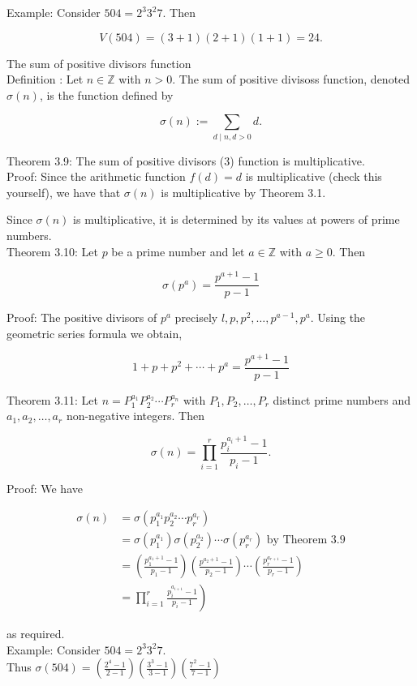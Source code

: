 \documentclass[10pt]{article}
\begin{document}
Example: Consider $504=2^{3} 3^{2} 7$. Then

$$
V(504)=(3+1)(2+1)(1+1)=24 .
$$

The sum of positive divisors function\\
Definition : Let $n \in \mathbb{Z}$ with $n>0$. The sum of positive divisoss function, denoted $\sigma(n)$, is the function defined by

$$
\sigma(n):=\sum_{d \mid n, d>0} d .
$$

Theorem 3.9: The sum of positive divisors (3) function is multiplicative.\\
Proof: Since the arithmetic function $f(d)=d$ is multiplicative (check this yourself), we have that $\sigma(n)$ is multiplicative by Theorem 3.1.

Since $\sigma(n)$ is multiplicative, it is determined by its values at powers of prime numbers.\\
Theorem 3.10: Let $p$ be a prime number and let $a \in \mathbb{Z}$ with $a \geqslant 0$. Then

$$
\sigma\left(p^{a}\right)=\frac{p^{a+1}-1}{p-1}
$$

Proof: The positive divisors of $p^{a}$ precisely $l, p, p^{2}, \ldots, p^{a-1}, p^{a}$. Using the geometric series formula we obtain,

$$
1+p+p^{2}+\cdots+p^{a}=\frac{p^{a+1}-1}{p-1}
$$

Theorem 3.11: Let $n=P_{1}^{a_{1}} P_{2}^{a_{2}} \cdots P_{r}^{a_{n}}$ with $P_{1}, P_{2}, \ldots, P_{r}$ distinct prime numbers and $a_{1}, a_{2}, \ldots, a_{r}$ non-negative integers. Then

$$
\sigma(n)=\prod_{i=1}^{r} \frac{p_{i}^{a_{i}+1}-1}{p_{i}-1} .
$$

Proof: We have

$$
\begin{aligned}
\sigma(n) & =\sigma\left(p_{1}^{a_{1}} p_{2}^{a_{2}} \cdots p_{r}^{a_{r}}\right) \\
& =\sigma\left(p_{1}^{a_{1}}\right) \sigma\left(p_{2}^{a_{2}}\right) \cdots \sigma\left(p_{r}^{a_{r}}\right) \text { by Theorem } 3.9 \\
& =\left(\frac{p_{1}^{a_{1}+1}-1}{p_{1}-1}\right)\left(\frac{p^{a_{2}+1}-1}{p_{2}-1}\right) \cdots\left(\frac{p_{r}^{a_{r+1}}-1}{p_{r}-1}\right) \\
& \left.=\prod_{i=1}^{r} \frac{p_{i}^{a_{i+1}}-1}{p_{i}-1}\right)
\end{aligned}
$$

as required.\\
Example: Consider $504=2^{3} 3^{2} 7$.\\
Thus $\sigma(504)=\left(\frac{2^{4}-1}{2-1}\right)\left(\frac{3^{3}-1}{3-1}\right)\left(\frac{7^{2}-1}{7-1}\right)$
\end{document}
